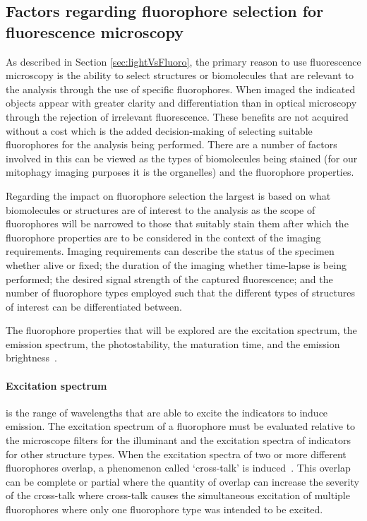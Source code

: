 \subsection{Factors regarding fluorophore selection for fluorescence microscopy}\label{sec:FluoroProcess} 
As described in Section \ref{sec:lightVsFluoro}, the primary reason to use fluorescence microscopy is the ability to select structures or biomolecules that are relevant to the analysis through the use of specific fluorophores. When imaged the indicated objects appear with greater clarity and differentiation than in optical microscopy through the rejection of irrelevant fluorescence. These benefits are not acquired without a cost which is the added decision-making of selecting suitable fluorophores for the analysis being performed. There are a number of factors involved in this can be viewed as the types of biomolecules being stained (for our mitophagy imaging purposes it is the organelles) and the fluorophore properties.\par Regarding the impact on fluorophore selection the largest is based on what biomolecules or structures are of interest to the analysis as the scope of fluorophores will be narrowed to those that suitably stain them after which the fluorophore properties are to be considered in the context of the imaging requirements. Imaging requirements can describe the status of the specimen whether alive or fixed; the duration of the imaging whether time-lapse is being performed; the desired signal strength of the captured fluorescence; and the number of fluorophore types employed such that the different types of structures of interest can be differentiated between.\par The fluorophore properties that will be explored are the excitation spectrum, the emission spectrum, the photostability, the maturation time, and the emission brightness~\cite{fluorophorePick, fluoro_properties_2, fluorophore_article}.

\paragraph{Excitation spectrum} is the range of wavelengths that are able to excite the indicators to induce emission. The excitation spectrum of a fluorophore must be evaluated relative to the microscope filters for the illuminant and the excitation spectra of indicators for other structure types. When the excitation spectra of two or more different fluorophores overlap, a phenomenon called `cross-talk' is induced~\cite{Bolte-2006}. This overlap can be complete or partial where the quantity of overlap can increase the severity of the cross-talk where cross-talk causes the simultaneous excitation of multiple fluorophores where only one fluorophore type was intended to be excited.

